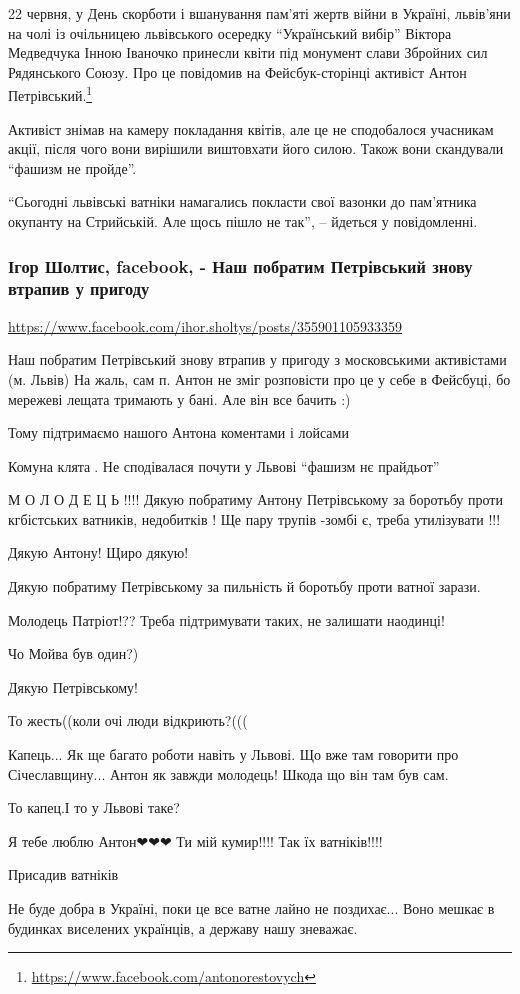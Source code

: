 22 червня, у День скорботи і вшанування пам'яті жертв війни в Україні,
львів'яни на чолі із очільницею львівського осередку \enquote{Український вибір}
Віктора Медведчука Інною Іваночко принесли квіти під монумент слави Збройних
сил Рядянського Союзу.  Про це повідомив на Фейсбук-сторінці активіст Антон
Петрівський.\footnote{\url{https://www.facebook.com/antonorestovych}}

Активіст знімав на камеру покладання квітів, але це не сподобалося учасникам
акції, після чого вони вирішили виштовхати його силою. Також вони скандували
\enquote{фашизм не пройде}.

\enquote{Сьогодні львівські ватніки намагались покласти свої вазонки до пам'ятника
окупанту на Стрийській. Але щось пішло не так}, – йдеться у повідомленні.

\subsubsection{Ігор Шолтис, facebook, - Наш побратим Петрівський знову втрапив у пригоду}
\url{https://www.facebook.com/ihor.sholtys/posts/355901105933359}

Наш побратим Петрівський знову втрапив у пригоду з московськими активістами (м.
Львів) На жаль, сам п. Антон не зміг розповісти про це у себе в Фейсбуці, бо
мережеві лещата тримають у бані.  Але він все бачить :)

Тому підтримаємо нашого Антона коментами і лойсами

\begin{itemize}
Комуна клята🤬. Не сподівалася почути у Львові \enquote{фашизм нє прайдьот} 🤬🤬🤬

М О Л О Д Е Ц Ь !!!!
Дякую побратиму Антону Петрівському за боротьбу проти кгбістських ватників,
недобитків ! Ще пару трупів -зомбі є, треба утилізувати !!!

Дякую Антону! Щиро дякую!

Дякую побратиму Петрівському за пильність й боротьбу проти ватної зарази.

Молодець Патріот!?? Треба підтримувати таких, не залишати наодинці!

Чо Мойва був один?)

Дякую Петрівському!

То жесть((коли очі люди відкриють?(((


Капець... Як ще багато роботи навіть у Львові. Що вже там говорити про
Січеславщину...  Антон як завжди молодець! Шкода що він там був сам.


То капец.І то у Львові таке?

Я тебе люблю Антон❤❤❤ Ти мій кумир!!!! Так їх ватніків!!!!

Присадив ватніків 💪

Не буде добра в Україні, поки це все ватне лайно не поздихає... Воно мешкає в будинках виселених українців, а державу нашу зневажає.
\end{itemize}
